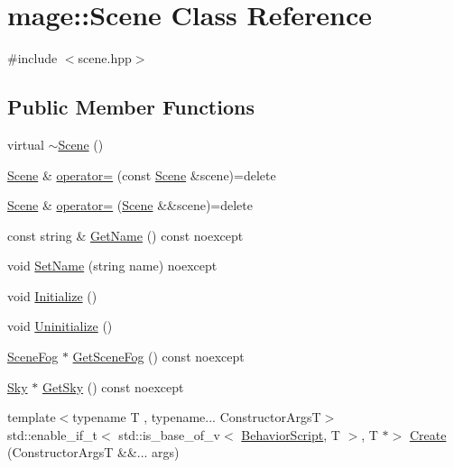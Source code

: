 \hypertarget{classmage_1_1_scene}{}\section{mage\+:\+:Scene Class Reference}
\label{classmage_1_1_scene}


{\ttfamily \#include $<$scene.\+hpp$>$}

\subsection*{Public Member Functions}
\begin{DoxyCompactItemize}
\item 
virtual \hyperlink{classmage_1_1_scene_adc40910fdca62586659c2961fe7e7f3c}{$\sim$\+Scene} ()
\item 
\hyperlink{classmage_1_1_scene}{Scene} \& \hyperlink{classmage_1_1_scene_a2c25c0fedc0230771d8c00a8288a69ce}{operator=} (const \hyperlink{classmage_1_1_scene}{Scene} \&scene)=delete
\item 
\hyperlink{classmage_1_1_scene}{Scene} \& \hyperlink{classmage_1_1_scene_a400926762670c9cd9b6d456291600f53}{operator=} (\hyperlink{classmage_1_1_scene}{Scene} \&\&scene)=delete
\item 
const string \& \hyperlink{classmage_1_1_scene_a6afd25c30d08eb579eb430af49cf8fc0}{Get\+Name} () const noexcept
\item 
void \hyperlink{classmage_1_1_scene_ae5e0a4daa62322ff18d673944ad4e0e8}{Set\+Name} (string name) noexcept
\item 
void \hyperlink{classmage_1_1_scene_a3cd12ef381ca743bf0b8f8aa2a76eb57}{Initialize} ()
\item 
void \hyperlink{classmage_1_1_scene_a714dc33c04dc2b8e2cec93564905b174}{Uninitialize} ()
\item 
\hyperlink{classmage_1_1_scene_fog}{Scene\+Fog} $\ast$ \hyperlink{classmage_1_1_scene_a1f21d92feb659477ceb4642322fa2f0c}{Get\+Scene\+Fog} () const noexcept
\item 
\hyperlink{classmage_1_1_sky}{Sky} $\ast$ \hyperlink{classmage_1_1_scene_afecf68ec8c48d4c28082f99d8042e700}{Get\+Sky} () const noexcept
\item 
{\footnotesize template$<$typename T , typename... Constructor\+ArgsT$>$ }\\std\+::enable\+\_\+if\+\_\+t$<$ std\+::is\+\_\+base\+\_\+of\+\_\+v$<$ \hyperlink{classmage_1_1_behavior_script}{Behavior\+Script}, T $>$, T $\ast$$>$ \hyperlink{classmage_1_1_scene_af4dbd3e1808b8e4db2c9c8f39eb151b7}{Create} (Constructor\+ArgsT \&\&... args)
$$
\end{DoxyCompactItemize}
